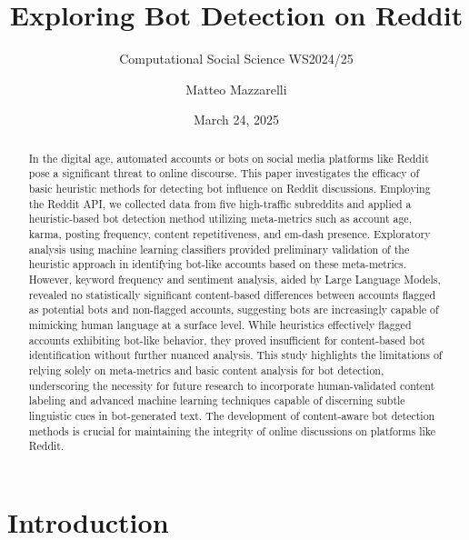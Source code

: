 \documentclass[
  12pt,
  letterpaper,
  DIV=11,
  numbers=noendperiod,
  abstract]{scrartcl}
\title{Exploring Bot Detection on Reddit}
\subtitle{Computational Social Science WS2024/25}
\author{Matteo Mazzarelli}
\date{March 24, 2025}
\makeatletter
\renewcommand{\maketitle}{\bgroup\setlength{\parindent}{0pt}
\begin{flushleft}
  {\sffamily\huge\textbf{\MakeUppercase{\@title}}} \vspace{0.3cm} \newline
  {\Large {\@subtitle}} \newline
  \@author
\end{flushleft}\egroup
}
\makeatother
\begin{document}
\maketitle
\begin{abstract}
In the digital age, automated accounts or bots on social media platforms
like Reddit pose a significant threat to online discourse. This paper
investigates the efficacy of basic heuristic methods for detecting bot
influence on Reddit discussions. Employing the Reddit API, we collected
data from five high-traffic subreddits and applied a heuristic-based bot
detection method utilizing meta-metrics such as account age, karma,
posting frequency, content repetitiveness, and em-dash presence.
Exploratory analysis using machine learning classifiers provided
preliminary validation of the heuristic approach in identifying bot-like
accounts based on these meta-metrics. However, keyword frequency and
sentiment analysis, aided by Large Language Models, revealed no
statistically significant content-based differences between accounts
flagged as potential bots and non-flagged accounts, suggesting bots are
increasingly capable of mimicking human language at a surface level.
While heuristics effectively flagged accounts exhibiting bot-like
behavior, they proved insufficient for content-based bot identification
without further nuanced analysis. This study highlights the limitations
of relying solely on meta-metrics and basic content analysis for bot
detection, underscoring the necessity for future research to incorporate
human-validated content labeling and advanced machine learning
techniques capable of discerning subtle linguistic cues in bot-generated
text. The development of content-aware bot detection methods is crucial
for maintaining the integrity of online discussions on platforms like
Reddit.
\end{abstract}

\pagestyle{mystyle}


\newpage

\tableofcontents

\newpage

\section{Introduction}\label{introduction}
\end{document}
